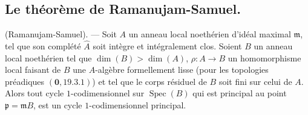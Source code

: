 \subsection{Le théorème de Ramanujam-Samuel.}
\label{IV.21.14}

\begin{theorem}[21.14.1]
\label{IV.21.14.1}
\textup{(Ramanujam-Samuel)}. ---
Soit $A$ un anneau local noethérien d'idéal maximal $\mathfrak m$, tel que son complété
$\widehat A$ soit intègre et intégralement clos. Soient $B$ un anneau local noethérien
tel que $\dim(B)>\dim(A)$, $\rho:A\to B$ un homomorphisme local faisant de $B$
une $A$-algèbre formellement lisse \textup{(}pour les topologies préadiques
$(\mathbf 0, 19.3.1)$\textup{)} et tel que le corps résiduel de $B$ soit fini sur celui de $A$.
Alors tout cycle $1$-codimensionnel sur $\operatorname{Spec}(B)$ qui est principal au
point $\mathfrak p=\mathfrak mB$, est un cycle $1$-codimensionnel principal.
\end{theorem}

